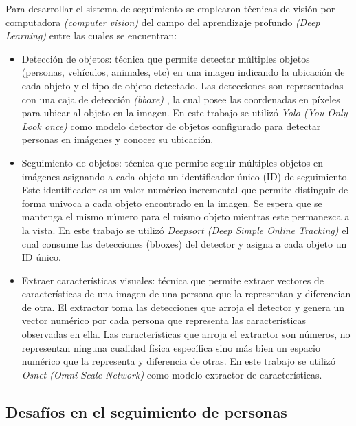 \documentclass[conference]{IEEEtran}
\begin{document}
Para desarrollar el sistema de seguimiento se emplearon técnicas de visión por computadora \textit{(computer vision)} \cite{b6} del campo del aprendizaje profundo \textit{(Deep Learning)} \cite{b7} entre las cuales se encuentran:
\begin{itemize}
\item Detección de objetos: técnica que permite detectar múltiples objetos \cite{b8} (personas, vehículos, animales, etc) en una imagen indicando la ubicación de cada objeto y el tipo de objeto detectado. Las detecciones son representadas con una caja de detección \textit{(bboxe)} \cite{b9} , la cual posee las coordenadas en píxeles para ubicar al objeto en la imagen. En este trabajo se utilizó \textit{Yolo (You Only Look once)} \cite{b10} como modelo detector de objetos configurado para detectar personas en imágenes y conocer su ubicación.
\item Seguimiento de objetos: técnica que permite seguir múltiples objetos en imágenes \cite{b11} asignando a cada objeto un identificador único (ID) de seguimiento. Este identificador es un valor numérico incremental que permite distinguir de forma univoca a cada objeto encontrado en la imagen. Se espera que se mantenga el mismo número para el mismo objeto mientras este permanezca a la vista. En este trabajo se utilizó \textit{Deepsort (Deep Simple Online Tracking)} \cite{b12} el cual consume las detecciones (bboxes) del detector y asigna a cada objeto un ID único.
\item Extraer características visuales: técnica que permite extraer vectores de características de una imagen de una persona que la representan y diferencian de otra. El extractor toma las detecciones que arroja el detector y genera un vector numérico por cada persona que representa las características observadas en ella.  Las características que arroja el extractor son números, no representan ninguna cualidad física específica sino más bien un espacio numérico que la representa y diferencia de otras. En este trabajo se utilizó \textit{Osnet (Omni-Scale Network)} \cite{b13} como modelo extractor de características.
\end{itemize}

\subsection{Desafíos en el seguimiento de personas}
\end{document}
